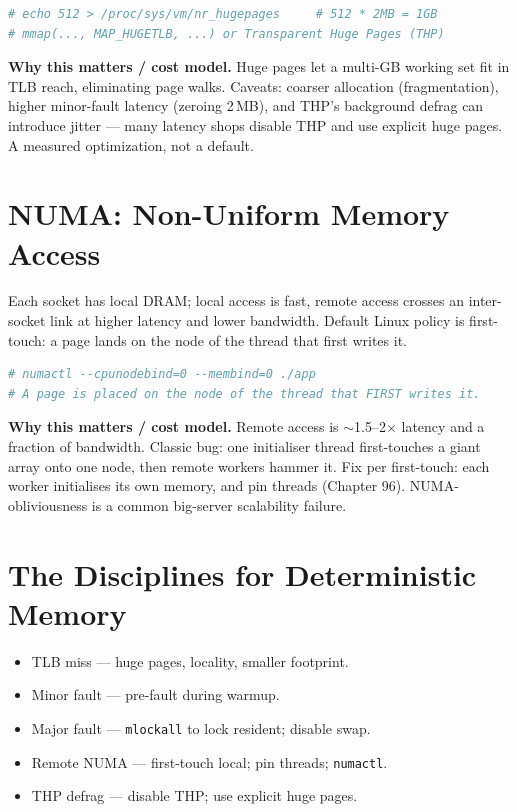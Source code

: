\begin{lstlisting}[language=bash, caption={Reserving huge pages on Linux (non-portable, privileged).}]
# echo 512 > /proc/sys/vm/nr_hugepages     # 512 * 2MB = 1GB
# mmap(..., MAP_HUGETLB, ...) or Transparent Huge Pages (THP)
\end{lstlisting}

\textbf{Why this matters / cost model.} Huge pages let a multi-GB working set fit in TLB reach, eliminating page walks. Caveats: coarser allocation (fragmentation), higher minor-fault latency (zeroing 2\,MB), and THP's background defrag can introduce jitter --- many latency shops disable THP and use explicit huge pages. A measured optimization, not a default.

\section{NUMA: Non-Uniform Memory Access}
Each socket has local DRAM; local access is fast, remote access crosses an inter-socket link at higher latency and lower bandwidth. Default Linux policy is first-touch: a page lands on the node of the thread that first writes it.

\begin{lstlisting}[language=bash, caption={Binding to a NUMA node; first-touch placement. Non-portable.}]
# numactl --cpunodebind=0 --membind=0 ./app
# A page is placed on the node of the thread that FIRST writes it.
\end{lstlisting}

\textbf{Why this matters / cost model.} Remote access is $\sim$1.5--2$\times$ latency and a fraction of bandwidth. Classic bug: one initialiser thread first-touches a giant array onto one node, then remote workers hammer it. Fix per first-touch: each worker initialises its own memory, and pin threads (Chapter 96). NUMA-obliviousness is a common big-server scalability failure.

\section{The Disciplines for Deterministic Memory}
\begin{itemize}
\item TLB miss --- huge pages, locality, smaller footprint.
\item Minor fault --- pre-fault during warmup.
\item Major fault --- \texttt{mlockall} to lock resident; disable swap.
\item Remote NUMA --- first-touch local; pin threads; \texttt{numactl}.
\item THP defrag --- disable THP; use explicit huge pages.
\end{itemize}

